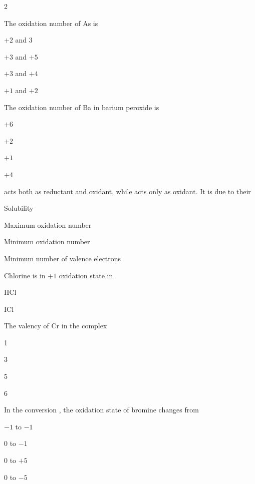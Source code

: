 \documentclass[10pt,a4paper]{article}
\begin{document}
\begin{multicols}{2}
\begin{questions}[start=1]
\item The oxidation number of As is
\begin{options}
  \item $+2$ and $3$
  \item $+3$ and $+5$
  \item $+3$ and $+4$
  \item $+1$ and $+2$
\end{options}

\item The oxidation number of Ba in barium peroxide is
\begin{options}
  \item $+6$
  \item $+2$
  \item $+1$
  \item $+4$
\end{options}

\item {} acts both as reductant and oxidant, while  acts only as oxidant. It is due to their
\begin{options}
  \item Solubility
  \item Maximum oxidation number
  \item Minimum oxidation number
  \item Minimum number of valence electrons
\end{options}

\item Chlorine is in $+1$ oxidation state in
\begin{options}
  \item HCl
  \item {}
  \item ICl
  \item {}
\end{options}

\item The valency of Cr in the complex \ce{[Cr(H2O)4Cl2]+}
\begin{options}
  \item 1
  \item 3
  \item 5
  \item 6
\end{options}

\item In the conversion , the oxidation state of bromine changes from
\begin{options}
  \item $-1$ to $-1$
  \item $0$ to $-1$
  \item $0$ to $+5$
  \item $0$ to $-5$
\end{options}


\end{questions}
\end{multicols}
\end{document}
